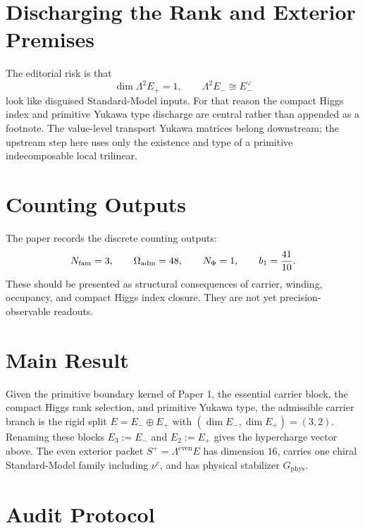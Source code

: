 \documentclass[11pt,a4paper]{article}
\begin{document}
\section{Discharging the Rank and Exterior Premises}

The editorial risk is that
\[
\dim \Lambda^2E_+=1,
\qquad
\Lambda^2E_-\cong E_-^\vee
\]
look like disguised Standard-Model inputs. For that reason the compact Higgs index and primitive
Yukawa type discharge are central rather than appended as a footnote. The value-level transport
Yukawa matrices belong downstream; the upstream step here uses only the existence and type of a
primitive indecomposable local trilinear.

\section{Counting Outputs}

The paper records the discrete counting outputs:
\[
N_{\mathrm{fam}}=3,
\qquad
\Omega_{\mathrm{adm}}=48,
\qquad
N_\Phi=1,
\qquad
b_1=\frac{41}{10}.
\]
These should be presented as structural consequences of carrier, winding, occupancy, and compact
Higgs index closure. They are not yet precision-observable readouts.

\section{Main Result}

\begin{theorem}
Given the primitive boundary kernel of Paper 1, the essential carrier block, the compact Higgs
rank selection, and primitive Yukawa type, the admissible carrier branch is the rigid split
$E=E_-\oplus E_+$ with $(\dim E_-,\dim E_+)=(3,2)$. Renaming these blocks
$E_3:=E_-$ and $E_2:=E_+$ gives the hypercharge vector above. The even exterior packet
$S^+=\Lambda^{\mathrm{even}}E$ has dimension $16$, carries one chiral Standard-Model family
including $\nu^c$, and has physical stabilizer $G_{\mathrm{phys}}$.
\end{theorem}

\section{Audit Protocol}
\end{document}
